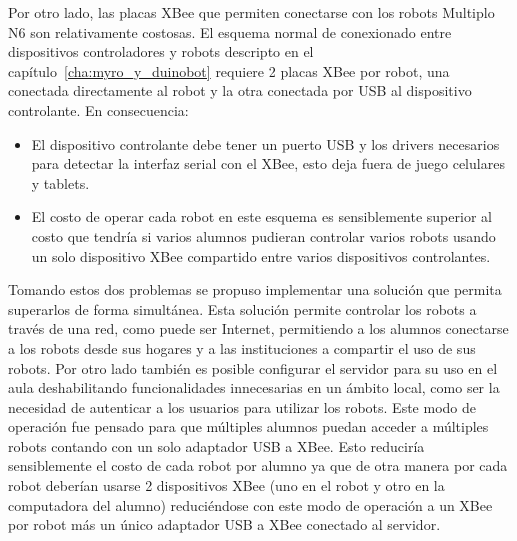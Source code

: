 Por otro lado, las placas
XBee que permiten conectarse con los robots Multiplo N6
son relativamente costosas. El esquema normal de conexionado entre dispositivos
controladores y robots descripto en el capítulo~\ref{cha:myro_y_duinobot}
requiere
2 placas XBee por robot, una conectada directamente al robot y la otra
conectada por USB al dispositivo controlante. En consecuencia:
\begin{itemize}
    \item El dispositivo controlante debe tener un puerto USB y los drivers
        necesarios para detectar la interfaz serial con el XBee, esto deja
        fuera de juego celulares y tablets.
    \item El costo de operar cada robot en este esquema es sensiblemente
        superior al costo que tendría si varios alumnos pudieran
        controlar varios robots usando un solo dispositivo XBee compartido
        entre varios dispositivos controlantes.
\end{itemize}

Tomando estos dos problemas se propuso implementar una solución
que permita
superarlos de forma simultánea. Esta solución permite controlar los
robots a través de una red, como puede ser Internet, permitiendo a los alumnos
conectarse a los robots desde sus hogares y a las instituciones a compartir
el uso de sus robots. Por otro lado también es posible configurar el servidor
para su uso en el aula deshabilitando funcionalidades innecesarias en un ámbito
local, como ser la necesidad de autenticar a los usuarios para utilizar los
robots. Este modo de operación fue pensado para que múltiples alumnos puedan
acceder a múltiples robots contando con un solo adaptador USB a XBee. Esto
reduciría sensiblemente el costo de cada robot por alumno ya que de otra
manera por cada robot deberían usarse 2 dispositivos XBee (uno en el robot
y otro en la computadora del alumno) reduciéndose con este modo de operación
a un XBee por robot más un único adaptador USB a XBee conectado al servidor.

